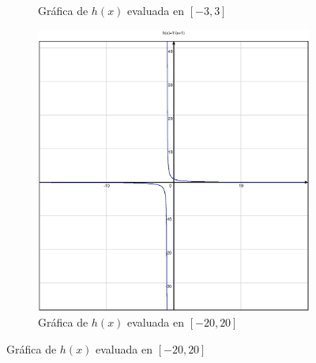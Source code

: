 \documentclass[10pt]{article}
\begin{document}
\begin{figure}[H]
\begin{subfigure}[b]{0.3\textwidth}
        \centering
        \caption{Gráfica de $h(x)$ evaluada en $[-3,3]$}
        \label{im:graficaG}
    \end{subfigure}
    \hfill
    \begin{subfigure}[b]{0.3\textwidth}
        \includegraphics[width=\textwidth]{figures/graficaH.eps}
        \centering
        \caption{Gráfica de $h(x)$ evaluada en $[-20,20]$}
        \label{im:graficaH}
    \end{subfigure}
\end{figure}
\end{document}
